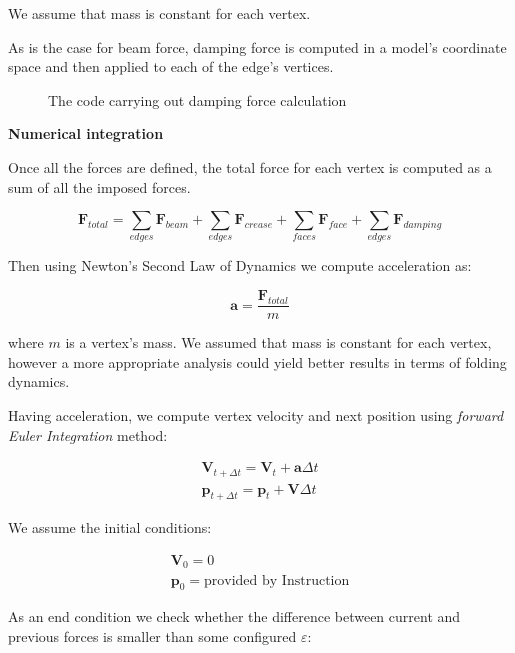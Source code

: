 We assume that mass is constant for each vertex.

As is the case for beam force, damping force is computed in a model's coordinate space
and then applied to each of the edge's vertices.
\smallskip

\begin{figure}[H]
	\centering
	\caption{The code carrying out damping force calculation}
	
\end{figure}

\medskip
\textbf{Numerical integration}
\smallskip

Once all the forces are defined, the total force for each vertex is computed as a sum of all the imposed forces.

\begin{equation} \label{solver:total_force}
	\pmb{F}_{total} = \sum_{edges} \pmb{F}_{beam} + \sum_{edges} \pmb{F}_{crease} + \sum_{faces}\pmb{F}_{face} + \sum_{edges}\pmb{F}_{damping}
\end{equation}

Then using Newton's Second Law of Dynamics we compute acceleration as:

$$
\pmb{a} = \frac{\pmb{F}_{total}}{m}
$$

where $m$ is a vertex's mass. We assumed that mass is constant for each vertex, however a more appropriate analysis could yield
better results in terms of folding dynamics.

Having acceleration, we compute vertex velocity and next position using \textit{forward Euler Integration} method:

$$
\begin{aligned}
\pmb{V}_{t+\Delta t} = \pmb{V}_t + \pmb{a}\Delta t \\
\pmb{p}_{t+\Delta t} = \pmb{p}_t + \pmb{V}\Delta t
\end{aligned}
$$

We assume the initial conditions:

\begin{equation}
	\begin{aligned}
		\pmb{V}_0 = 0\\
		\pmb{p}_0 = \text{provided by Instruction}
	\end{aligned}
\end{equation}


As an end condition we check whether the difference between current and previous forces is smaller than some configured $\varepsilon$:

